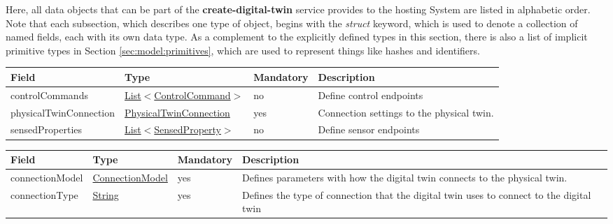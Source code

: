 \documentclass[a4paper]{arrowhead}
\newcommand{\pref}[1]{{\textcolor{ArrowheadGrey}{\hyperref[sec:model:primitives:#1]{#1}}}}
\begin{document}
Here, all data objects that can be part of the \textbf{create-digital-twin} service
provides to the hosting System are listed in alphabetic order.
Note that each subsection, which describes one type of object, begins with the \textit{struct} keyword, which is used to denote a collection of named fields, each with its own data type.
As a complement to the explicitly defined types in this section, there is also a list of implicit primitive types in Section \ref{sec:model:primitives}, which are used to represent things like hashes and identifiers.

\label{sec:model:DigitalTwinRequest}
 
\begin{table}[H]
\begin{tabularx}{\textwidth}{| p{4cm} | p{4cm} | p{2cm} | X |} \hline
\rowcolor{gray!33} Field & Type & Mandatory & Description \\ \hline
controlCommands & \pref{List}$<$\hyperref[sec:model:ControlCommand]{ControlCommand}$>$ & no & Define control endpoints \\ \hline
physicalTwinConnection & \hyperref[sec:model:PhysicalTwinConnection]{PhysicalTwinConnection} & yes & Connection settings to the physical twin. \\ \hline
sensedProperties & \pref{List}$<$\hyperref[sec:model:SensedProperty]{SensedProperty}$>$ & no & Define sensor endpoints \\ \hline
\end{tabularx}
\end{table}

\label{sec:model:PhysicalTwinConnection}
 
\begin{table}[H]
\begin{tabularx}{\textwidth}{| p{4.25cm} | p{3.5cm} | p{2cm} | X |} \hline
\rowcolor{gray!33} Field & Type & Mandatory & Description \\ \hline
connectionModel & \pref{ConnectionModel} & yes & Defines parameters with how the digital twin connects to the physical twin. \\ \hline
connectionType & \pref{String} & yes & Defines the type of connection that the digital twin uses to connect to the digital twin \\ \hline
\end{tabularx}
\end{table}

\label{sec:model:ConnectionModel}
 
\end{document}
